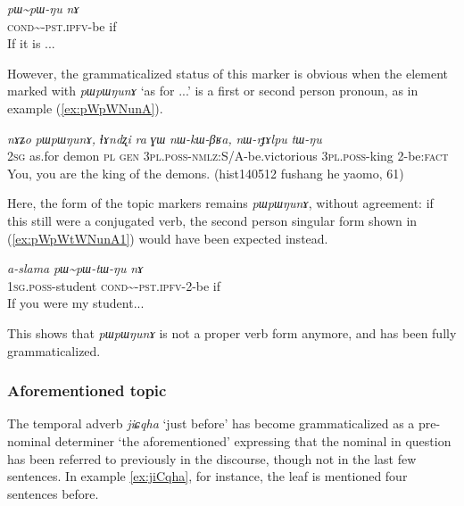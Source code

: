 \documentclass[oneside,a4paper,11pt]{article}
\newcommand{\ipa}[1]{\mbox{\phon\textit{#1}}} %
\newcommand{\tld}{\textasciitilde{}}
\begin{document}
\begin{exe}
\ex \label{ex:pWpWNunA1}
\gll \ipa{pɯ\tld{}pɯ-ŋu} \ipa{nɤ} \\
\textsc{cond}\tld{}-\textsc{pst.ipfv}-be if \\
\glt If it is ...
\end{exe}

However, the grammaticalized status of this marker is obvious when the element marked with \ipa{pɯpɯŋunɤ} `as for ...' is a first or second person pronoun, as in example (\ref{ex:pWpWNunA}).

\begin{exe}
\ex \label{ex:pWpWNunA}
\gll \ipa{nɤʑo}	\ipa{pɯpɯŋunɤ,}	\ipa{ɬɤndʐi}	\ipa{ra}	\ipa{ɣɯ}	\ipa{nɯ-kɯ-βʁa,}	\ipa{nɯ-rɟɤlpu}	\ipa{tɯ-ŋu} \\
\textsc{2sg} as.for demon \textsc{pl} \textsc{gen} \textsc{3pl.poss}-\textsc{nmlz}:S/A-be.victorious \textsc{3pl.poss}-king 2-be:\textsc{fact} \\
\glt You, you are the king of the demons. (hist140512 fushang he yaomo, 61)
\end{exe}
Here, the form of the topic markers remains \ipa{pɯpɯŋunɤ}, without agreement: if this still were a conjugated verb, the second person singular form shown in (\ref{ex:pWpWtWNunA1}) would have been expected instead.

\begin{exe}
\ex \label{ex:pWpWtWNunA1}
\gll \ipa{a-slama} \ipa{pɯ\tld{}pɯ-tɯ-ŋu} \ipa{nɤ} \\
\textsc{1sg.poss}-student \textsc{cond}\tld{}-\textsc{pst.ipfv}-2-be if \\
\glt If you were my student...
\end{exe}

This shows that \ipa{pɯpɯŋunɤ} is not a proper verb form anymore, and has been fully grammaticalized.

\subsubsection{Aforementioned topic}
The temporal adverb \ipa{jiɕqha} `just before' has become grammaticalized as a pre-nominal determiner `the aforementioned' expressing that the nominal in question has been referred to previously in the discourse, though not in the last few sentences. In example \ref{ex:jiCqha}, for instance, the leaf is mentioned four sentences before.
\end{document}
